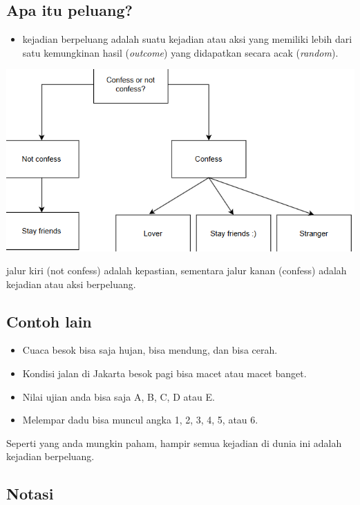 \documentclass[
  letterpaper,
  DIV=11,
  numbers=noendperiod]{scrartcl}
\providecommand{\tightlist}{%
  \setlength{\itemsep}{0pt}\setlength{\parskip}{0pt}}\usepackage{longtable,booktabs,array}
\begin{document}
\subsection{Apa itu peluang?}\label{apa-itu-peluang}

\begin{itemize}
\tightlist
\item
  kejadian berpeluang adalah suatu kejadian atau aksi yang memiliki
  lebih dari satu kemungkinan hasil (\emph{outcome}) yang didapatkan
  secara acak (\emph{random}).
\end{itemize}

\includegraphics{ea.png}

jalur kiri (not confess) adalah kepastian, sementara jalur kanan
(confess) adalah kejadian atau aksi berpeluang.

\subsection{Contoh lain}\label{contoh-lain}

\begin{itemize}
\item
  Cuaca besok bisa saja hujan, bisa mendung, dan bisa cerah.
\item
  Kondisi jalan di Jakarta besok pagi bisa macet atau macet banget.
\item
  Nilai ujian anda bisa saja A, B, C, D atau E.
\item
  Melempar dadu bisa muncul angka 1, 2, 3, 4, 5, atau 6.
\end{itemize}

Seperti yang anda mungkin paham, hampir semua kejadian di dunia ini
adalah kejadian berpeluang.

\subsection{Notasi}\label{notasi-1}
\end{document}
